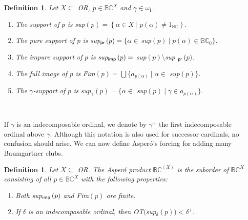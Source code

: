\documentclass{article}
\newtheorem{definition}[theorem]{Definition}
\begin{document}
\begin{definition}
Let $X\subseteq$ \textsf{OR}, $p\in\mathbb{BC}^{X}$ and $\gamma\in\omega_{1}.$

\begin{enumerate}
\item The \emph{support of} $p$ is \textsf{sup}$\left(  p\right)  =\left\{
\alpha\in X\mid p\left(  \alpha\right)  \neq1_{\mathbb{BC}}\right\}  .$

\item The \emph{pure support of} $p$ is \textsf{sup}$_{\text{\textsf{pr}}%
}\left(  p\right)  =\{\alpha\in$ \textsf{sup}$\left(  p\right)  \mid p\left(
\alpha\right)  \in\mathbb{BC}_{0}\}.$

\item The \emph{impure support of} $p$ is \textsf{sup}$_{\text{\textsf{imp}}%
}\left(  p\right)  =$ \textsf{sup}$\left(  p\right)  \setminus$\textsf{sup}%
$_{\text{\textsf{pr}}}\left(  p\right)  $.

\item The \emph{full image of }$p$ is \textsf{Fim}$\left(  p\right)
=\bigcup\{a_{p\left(  \alpha\right)  }\mid\alpha\in$ \textsf{sup}$\left(
p\right)  \}.$

\item The $\gamma$\emph{-support of} $p$ is \textsf{sup}$_{\gamma}\left(
p\right)  =\{\alpha\in$ \textsf{sup}$\left(  p\right)  \mid\gamma\in
a_{p\left(  \alpha\right)  }\}.$
\end{enumerate}
\end{definition}

\qquad\qquad\qquad\ \ \ \ 

If $\gamma$ is an indecomposable ordinal, we denote by $\gamma^{+}$ the first
indecomposable ordinal above $\gamma.$ Although this notation is also used for
successor cardinals, no confusion should arise. We can now define Asper\'{o}'s
forcing for adding many Baumgartner clubs.

\begin{definition}
Let $X\subseteq$ \textsf{OR. }The \textsf{Asper\'{o} product }$\mathbb{BC}%
^{\left(  X\right)  }$ is the suborder of $\mathbb{BC}^{X}$ consisting of all
$p\in\mathbb{BC}^{X}$ with the following properties:

\begin{enumerate}
\item Both \textsf{sup}$_{\text{\textsf{imp}}}\left(  p\right)  $ and
\textsf{Fim}$\left(  p\right)  $ are finite.

\item If $\delta$ is an indecomposable ordinal, then \textsf{OT}$\mathsf{(}%
$\textsf{sup}$_{\delta}\left(  p\right)  )<\delta^{+}.$
\end{enumerate}
\end{definition}
\end{document}
